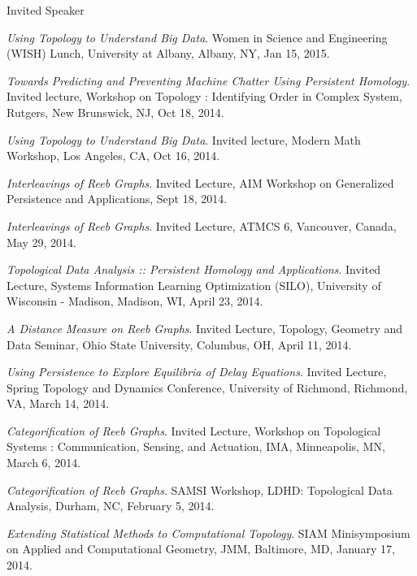\documentclass{resume} %
\begin{document}
\begin{rSection}{Invited Speaker}
\begin{etaremune}
\item\emph{Using Topology to Understand Big Data}. Women in Science and Engineering (WISH) Lunch, University at Albany, Albany, NY, Jan 15, 2015. 

\item\emph{Towards Predicting and Preventing Machine Chatter Using Persistent Homology}. Invited lecture, Workshop on Topology : Identifying Order in Complex System, Rutgers, New Brunswick, NJ, Oct 18, 2014. 

\item\emph{Using Topology to Understand Big Data}. Invited lecture, Modern Math Workshop, Los Angeles, CA, Oct 16, 2014. 

\item\emph{Interleavings of Reeb Graphs}. Invited Lecture, AIM Workshop on Generalized Persistence and Applications, Sept 18, 2014. 

\item\emph{Interleavings of Reeb Graphs}. Invited Lecture, ATMCS 6, Vancouver, Canada, May 29, 2014. 

\item\emph{Topological Data Analysis :: Persistent Homology and Applications}. Invited Lecture, Systems Information Learning Optimization (SILO), University of Wisconsin - Madison, Madison, WI, April 23, 2014. 

\item\emph{A Distance Measure on Reeb Graphs}. Invited Lecture, Topology, Geometry and Data Seminar, Ohio State University, Columbus, OH, April 11, 2014. 

\item\emph{Using Persistence to Explore Equilibria of Delay Equations}. Invited Lecture, Spring Topology and Dynamics Conference, University of Richmond, Richmond, VA, March 14, 2014. 

\item\emph{Categorification of Reeb Graphs}. Invited Lecture, Workshop on Topological Systems : Communication, Sensing, and Actuation, IMA, Minneapolis, MN, March 6, 2014. 

\item\emph{Categorification of Reeb Graphs}. SAMSI Workshop, LDHD: Topological Data Analysis, Durham, NC, February 5, 2014. 

\item\emph{Extending Statistical Methods to Computational Topology}. SIAM Minisymposium on Applied and Computational Geometry, JMM, Baltimore, MD, January 17, 2014. 


\end{etaremune}
\end{rSection}
\end{document}
